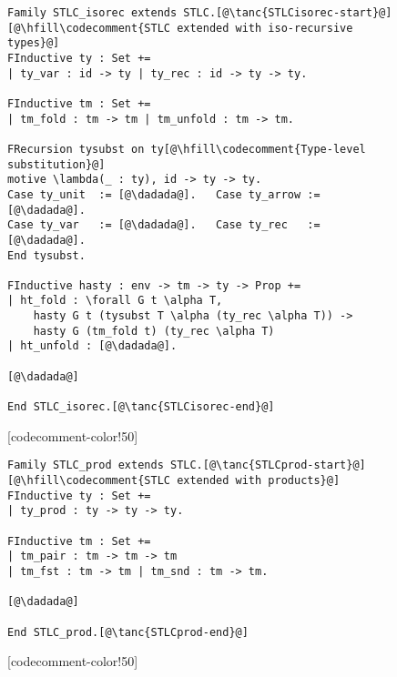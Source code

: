 \begin{figure}

\begin{minipage}{\textwidth}
\begin{multicols}{2}


\begin{lstlisting}
Family STLC_isorec extends STLC.[@\tanc{STLCisorec-start}@]
[@\hfill\codecomment{STLC extended with iso-recursive types}@]
FInductive ty : Set +=
| ty_var : id -> ty | ty_rec : id -> ty -> ty.

FInductive tm : Set +=
| tm_fold : tm -> tm | tm_unfold : tm -> tm.

FRecursion tysubst on ty[@\hfill\codecomment{Type-level substitution}@]
motive \lambda(_ : ty), id -> ty -> ty.
Case ty_unit  := [@\dadada@].   Case ty_arrow := [@\dadada@].
Case ty_var   := [@\dadada@].   Case ty_rec   := [@\dadada@].
End tysubst.

FInductive hasty : env -> tm -> ty -> Prop +=
| ht_fold : \forall G t \alpha T,
    hasty G t (tysubst T \alpha (ty_rec \alpha T)) ->
    hasty G (tm_fold t) (ty_rec \alpha T)
| ht_unfold : [@\dadada@].

[@\dadada@]

End STLC_isorec.[@\tanc{STLCisorec-end}@]
\end{lstlisting}

[codecomment-color!50]

\columnbreak


\begin{lstlisting}
Family STLC_prod extends STLC.[@\tanc{STLCprod-start}@]
[@\hfill\codecomment{STLC extended with products}@]
FInductive ty : Set +=
| ty_prod : ty -> ty -> ty.

FInductive tm : Set +=
| tm_pair : tm -> tm -> tm
| tm_fst : tm -> tm | tm_snd : tm -> tm.

[@\dadada@]

End STLC_prod.[@\tanc{STLCprod-end}@]
\end{lstlisting}

[codecomment-color!50]

\vspace{-5pt}


\end{multicols}
\end{minipage}
\end{figure}
